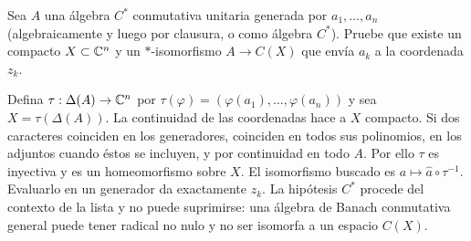 \begin{ejercicio}\label{ej:v3-l26-5}
Sea $A$ una álgebra $C^*$ conmutativa unitaria generada por $a_1,\ldots,a_n$ (algebraicamente y luego por clausura, o como álgebra $C^*$). Pruebe que existe un compacto $X\subset\mathbb C^n$ y un $*$-isomorfismo $A\to C(X)$ que envía $a_k$ a la coordenada $z_k$.
\end{ejercicio}
\begin{solucion}
Defina $\tau:\Delta(A)\to\mathbb C^n$ por $\tau(\varphi)=(\varphi(a_1),\ldots,\varphi(a_n))$ y sea $X=\tau(\Delta(A))$. La continuidad de las coordenadas hace a $X$ compacto. Si dos caracteres coinciden en los generadores, coinciden en todos sus polinomios, en los adjuntos cuando éstos se incluyen, y por continuidad en todo $A$. Por ello $\tau$ es inyectiva y es un homeomorfismo sobre $X$. El isomorfismo buscado es $a\mapsto\widehat a\circ\tau^{-1}$. Evaluarlo en un generador da exactamente $z_k$. La hipótesis $C^*$ procede del contexto de la lista y no puede suprimirse: una álgebra de Banach conmutativa general puede tener radical no nulo y no ser isomorfa a un espacio $C(X)$.
\end{solucion}


